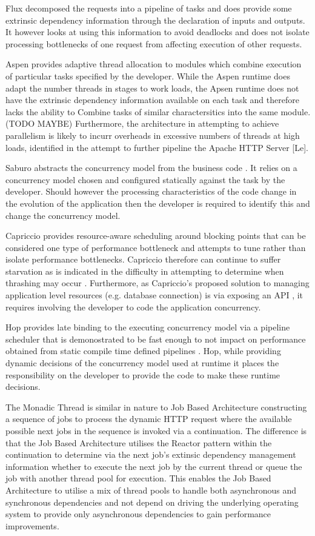 \documentclass[conference]{ieee/IEEEtran}
\begin{document}
Flux \cite{flux} decomposed the requests into a pipeline of tasks and does
provide some extrinsic dependency information through the declaration of inputs and
outputs.  It however looks at using this information to avoid deadlocks and
does not isolate processing bottlenecks of one request from affecting execution
of other requests.
   
Aspen \cite{aspen} provides adaptive thread allocation to modules which combine
execution of particular tasks specified by the developer.  While the Aspen
runtime does adapt the number threads in stages to work loads, the Apsen runtime
does not have the extrinsic dependency information available on each task and
therefore lacks the ability to Combine tasks of similar charactersitics into the
same module.  (TODO MAYBE) Furthermore, the architecture in attempting to
achieve parallelism is likely to incurr overheads in excessive numbers of
threads at high loads, identified in the attempt to further pipeline the Apache
HTTP Server [Le].
   
Saburo abstracts the concurrency model from the business code \cite{saburo}.
It relies on a concurrency model chosen and configured statically against the
task by the developer.  Should however the processing characteristics of the
code change in the evolution of the application then the developer is required
to identify this and change the concurrency model.

Capriccio provides resource-aware scheduling around blocking points
\cite{capriccio} that can be considered one type of performance bottleneck and
attempts to tune rather than isolate performance bottlenecks.  Capriccio
therefore can continue to suffer starvation as is indicated in the difficulty in
attempting to determine when thrashing may occur \cite{capriccio}. Furthermore,
as Capriccio's proposed solution to managing application level resources (e.g.
database connection) is via exposing an API \cite{capriccio}, it requires
involving the developer to code the application concurrency.
   
Hop provides late binding to the executing concurrency model via a pipeline
scheduler that is demonostrated to be fast enough to not impact on performance
obtained from static compile time defined pipelines \cite{hop}.  Hop,
while providing dynamic decisions of the concurrency model used at runtime it places
the responsibility on the developer to provide the code to make these runtime
decisions.
   
The Monadic Thread \cite{monadic-thread} is similar in nature to Job Based Architecture
constructing a sequence of jobs to process the dynamic HTTP request where the
available possible next jobs in the sequence is invoked via a continuation. 
The difference is that the Job Based Architecture utilises the Reactor pattern
within the continuation to determine via the next job's extinsic dependency
management information whether to execute the next job by the current thread or
queue the job with another thread pool for execution.  This enables the Job
Based Architecture to utilise a mix of thread pools to handle both asynchronous
and synchronous dependencies and not depend on driving the underlying operating
system to provide only asynchronous dependencies to gain performance
improvements.
   
\end{document}
